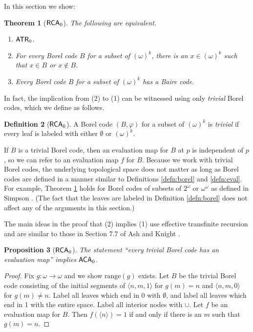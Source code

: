 \documentclass{amsart}
\newtheorem{thm}{Theorem}[section]
\newtheorem{prop}[thm]{Proposition}
\theoremstyle{definition}
\newtheorem{defn}[thm]{Definition}
\theoremstyle{remark}
\newcommand{\system}[1]{\mbox{\fontfamily{cmss}\fontshape{n}\fontseries{m}%
    \selectfont#1}}
\newcommand{\RCA}{\system{RCA}\ensuremath{_0}}
\newcommand{\ACA}{\system{ACA}\ensuremath{_0}}
\newcommand{\ATR}{\system{ATR}\ensuremath{_0}}
\begin{document}
In this section we show:
\begin{thm}[$\RCA$]
\label{ATRequiv}
The following are equivalent. 
\begin{enumerate}
\item $\ATR$.
\item For every Borel code $B$ for a subset of $(\omega)^k$, there is an $x \in (\omega)^k$ such that $x \in B$ or $x \not \in B$. 
\item Every Borel code $B$ for a subset of $(\omega)^k$ has a Baire code. 
\end{enumerate}
\end{thm}

In fact, the implication from (2) to (1) can be witnessed using only \emph{trivial}
Borel codes, which we define as follows.
\begin{defn}[$\RCA$]
A Borel code $(B,\varphi)$ for a subset of $(\omega)^k$
is \emph{trivial} if every leaf is labeled
with either $\emptyset$ or $(\omega)^k$.
\end{defn}
If $B$ is a trivial Borel code, then an evaluation map for $B$ at $p$ is independent of $p$, so we can refer to an evaluation map $f$ for $B$. 
Because we work with 
trivial Borel codes, the underlying topological space does not matter as long as Borel codes are defined in a manner similar to 
Definitions \ref{defn:borel} and \ref{defn:eval}. For example, Theorem \ref{ATRequiv} holds for Borel codes of subsets of $2^{\omega}$ or $\omega^{\omega}$ as 
defined in Simpson \cite{sosa}.  (The fact that the leaves are labeled in Definition \ref{defn:borel}
does not affect any of the arguments in this section.)


The main ideas in the proof that (2) implies (1) use effective transfinite 
recursion and are similar to those in Section 7.7 of Ash and Knight \cite{AK}. 



\begin{prop}[$\RCA$]
The statement ``every trivial Borel code has an evaluation map'' implies $\ACA$. 
\end{prop}

\begin{proof}
Fix $g: \omega \rightarrow \omega$ and we show $\text{range}(g)$ exists. Let $B$ be the trivial Borel code consisting of the initial segments of 
$\langle n,m,1 \rangle$ for $g(m) = n$ and $\langle n,m,0 \rangle$ for $g(m) \neq n$. 
Label all leaves which end in 0 with $\emptyset$, and label all leaves
which end in 1 with the entire space.  Label all interior nodes with $\cup$.
Let $f$ be an evaluation map for $B$.  Then $f(\langle n\rangle) = 1$
if and only if there is an $m$ such that $g(m)=n$.
\end{proof}
\end{document}
